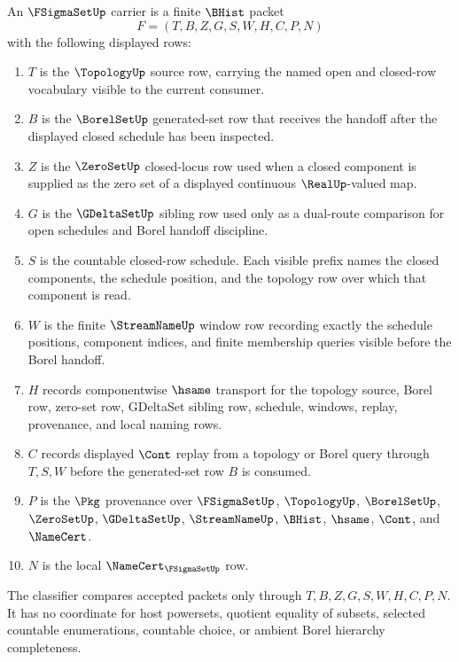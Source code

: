 \begin{definition}
\label{def:f-sigma-set-carrier}
An $\FSigmaSetUp$ carrier is a finite $\BHist$ packet
$$
F=(T,B,Z,G,S,W,H,C,P,N)
$$
with the following displayed rows:
\begin{enumerate}
\item $T$ is the $\TopologyUp$ source row, carrying the named open and closed-row vocabulary visible to the current consumer.
\item $B$ is the $\BorelSetUp$ generated-set row that receives the handoff after the displayed closed schedule has been inspected.
\item $Z$ is the $\ZeroSetUp$ closed-locus row used when a closed component is supplied as the zero set of a displayed continuous $\RealUp$-valued map.
\item $G$ is the $\GDeltaSetUp$ sibling row used only as a dual-route comparison for open schedules and Borel handoff discipline.
\item $S$ is the countable closed-row schedule. Each visible prefix names the closed components, the schedule position, and the topology row over which that component is read.
\item $W$ is the finite $\StreamNameUp$ window row recording exactly the schedule positions, component indices, and finite membership queries visible before the Borel handoff.
\item $H$ records componentwise $\hsame$ transport for the topology source, Borel row, zero-set row, GDeltaSet sibling row, schedule, windows, replay, provenance, and local naming rows.
\item $C$ records displayed $\Cont$ replay from a topology or Borel query through $T,S,W$ before the generated-set row $B$ is consumed.
\item $P$ is the $\Pkg$ provenance over $\FSigmaSetUp$, $\TopologyUp$, $\BorelSetUp$, $\ZeroSetUp$, $\GDeltaSetUp$, $\StreamNameUp$, $\BHist$, $\hsame$, $\Cont$, and $\NameCert$.
\item $N$ is the local $\NameCert_{\FSigmaSetUp}$ row.
\end{enumerate}
The classifier compares accepted packets only through $T,B,Z,G,S,W,H,C,P,N$. It has no coordinate for host powersets, quotient equality of subsets, selected countable enumerations, countable choice, or ambient Borel hierarchy completeness.
\end{definition}

